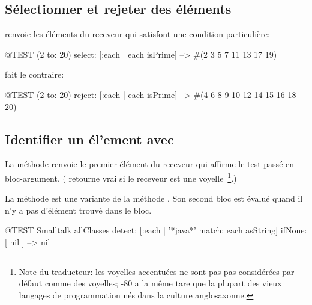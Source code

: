 \documentclass[a4paper,10pt,twoside]{book}
\begin{document}
\subsection{S\'electionner et rejeter des \'el\'ements}

 renvoie les \'el\'ements du receveur qui satisfont
une condition particuli\`ere:

\begin{code}{@TEST}
(2 to: 20) select: [:each | each isPrime] --> #(2 3 5 7 11 13 17 19)
\end{code}

 fait le contraire:
\begin{code}{@TEST}
(2 to: 20) reject: [:each | each isPrime] --> #(4 6 8 9 10 12 14 15 16 18 20)
\end{code}

\subsection{Identifier un \'el'ement avec }

La m\'ethode  renvoie le premier
\'el\'ement du receveur qui affirme le test pass\'e en bloc-argument.
( retourne vrai \cad {} si le receveur est une voyelle~\footnote{Note du traducteur: les voyelles accentu\'ees ne sont pas pas consid\'er\'ees par d\'efaut comme des voyelles; \st-80 a la m\^eme tare que la plupart des vieux langages de programmation n\'es dans la culture anglosaxonne.}.)

La m\'ethode  est une variante de la m\'ethode . Son second bloc est \'evalu\'e quand il n'y a pas d'\'el\'ement trouv\'e dans le bloc.

\begin{code}{@TEST}
Smalltalk allClasses detect: [:each | '*java*' match: each asString] ifNone: [ nil ] --> nil
\end{code}
\end{document}
